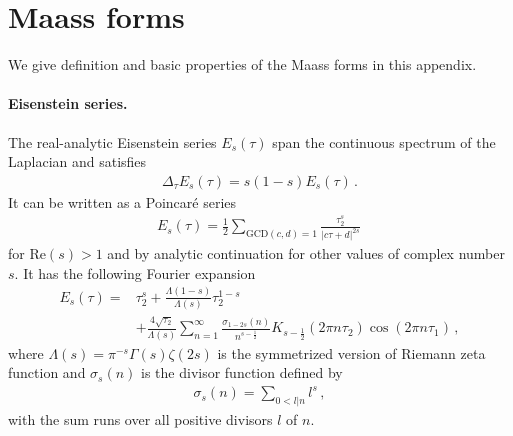 \documentclass[aps,twocolumn,prl,showpacs,amsmath,amssymb,10pt]{revtex4-2}
\begin{document}
\appendix
\section{Maass forms}
We give definition and basic properties of the Maass forms in this appendix.
\paragraph{Eisenstein series.} The real-analytic Eisenstein series $E_s(\tau)$ span the continuous spectrum of the Laplacian and satisfies
\begin{align}
\Delta_{\tau}E_s(\tau)=s(1-s)E_s(\tau)\,.
\end{align}
It can be written as a Poincar\'e series
\begin{align}
E_s(\tau)=\frac{1}{2}\sum_{\text{GCD}(c,d)=1}\frac{\tau_2^s}{|c\tau+d|^{2s}}\,
\end{align}
for $\text{Re}(s)>1$ and by analytic continuation for other values of complex number $s$. It has the following Fourier expansion
\begin{equation}
\begin{aligned}
E_s(\tau)=&\tau_2^s+\frac{\Lambda(1-s)}{\Lambda(s)}\tau_2^{1-s}\\
&+\frac{4\sqrt{\tau_2}}{\Lambda(s)}\sum_{n=1}^{\infty}\frac{\sigma_{1-2s}(n)}{n^{s-\frac{1}{2}}}K_{s-\frac{1}{2}}(2\pi n\tau_2)\cos(2\pi n\tau_1)\,,
\end{aligned}
\end{equation}
where $\Lambda(s)=\pi^{-s}\Gamma(s)\zeta(2s)$ is the symmetrized version of Riemann zeta function and $\sigma_s(n)$ is the divisor function defined by
\begin{align}
\sigma_s(n)=\sum_{0<l|n}l^s\,,
\end{align}
with the sum runs over all positive divisors $l$ of $n$.
\end{document}
